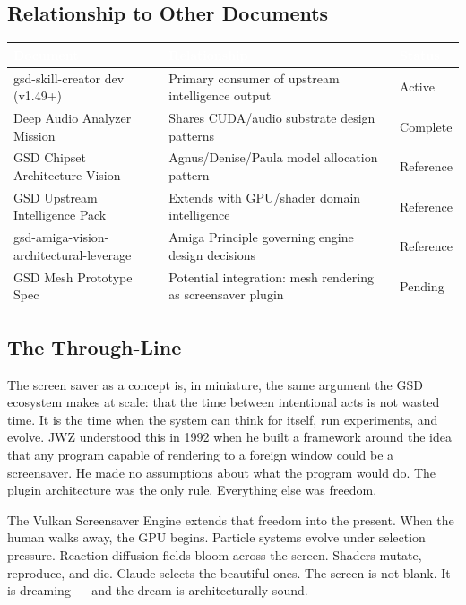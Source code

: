 \documentclass[11pt,letterpaper]{article}
\newcommand{\tableheader}[1]{\textbf{\sffamily\textcolor{white}{#1}}}
\begin{document}
\subsection{Relationship to Other Documents}

\begin{center}
\begin{tabularx}{\textwidth}{L{4cm}XC{2.5cm}}
\toprule
{}
\tableheader{Document} & \tableheader{Relationship} & \tableheader{Status} \\
\midrule
gsd-skill-creator dev (v1.49+) & Primary consumer of upstream intelligence output & Active \\
Deep Audio Analyzer Mission & Shares CUDA/audio substrate design patterns & Complete \\
GSD Chipset Architecture Vision & Agnus/Denise/Paula model allocation pattern & Reference \\
GSD Upstream Intelligence Pack & Extends with GPU/shader domain intelligence & Reference \\
gsd-amiga-vision-architectural-leverage & Amiga Principle governing engine design decisions & Reference \\
GSD Mesh Prototype Spec & Potential integration: mesh rendering as screensaver plugin & Pending \\
\bottomrule
\end{tabularx}
\end{center}

\subsection{The Through-Line}

The screen saver as a concept is, in miniature, the same argument the GSD ecosystem makes at scale: that the time between intentional acts is not wasted time. It is the time when the system can think for itself, run experiments, and evolve. JWZ understood this in 1992 when he built a framework around the idea that any program capable of rendering to a foreign window could be a screensaver. He made no assumptions about what the program would do. The plugin architecture was the only rule. Everything else was freedom.

The Vulkan Screensaver Engine extends that freedom into the present. When the human walks away, the GPU begins. Particle systems evolve under selection pressure. Reaction-diffusion fields bloom across the screen. Shaders mutate, reproduce, and die. Claude selects the beautiful ones. The screen is not blank. It is dreaming --- and the dream is architecturally sound.
\end{document}

